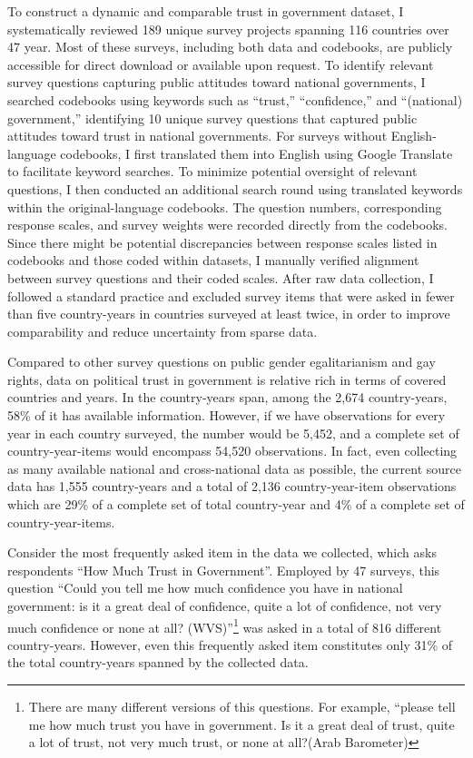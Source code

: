 \documentclass[
  12pt,
]{article}
\begin{document}
To construct a dynamic and comparable trust in government dataset, I systematically reviewed 189 unique survey projects spanning 116 countries over 47 year.
Most of these surveys, including both data and codebooks, are publicly accessible for direct download or available upon request.
To identify relevant survey questions capturing public attitudes toward national governments, I searched codebooks using keywords such as ``trust,'' ``confidence,'' and ``(national) government,'' identifying 10 unique survey questions that captured public attitudes toward trust in national governments.
For surveys without English-language codebooks, I first translated them into English using Google Translate to facilitate keyword searches.
To minimize potential oversight of relevant questions, I then conducted an additional search round using translated keywords within the original-language codebooks.
The question numbers, corresponding response scales, and survey weights were recorded directly from the codebooks.
Since there might be potential discrepancies between response scales listed in codebooks and those coded within datasets, I manually verified alignment between survey questions and their coded scales.
After raw data collection, I followed a standard practice and excluded survey items that were asked in fewer than five country-years in countries surveyed at least twice, in order to improve comparability and reduce uncertainty from sparse data.

Compared to other survey questions on public gender egalitarianism and gay rights, data on political trust in government is relative rich in terms of covered countries and years.
In the country-years span, among the 2,674 country-years, 58\% of it has available information.
However, if we have observations for every year in each country surveyed, the number would be 5,452, and a complete set of country-year-items would encompass 54,520 observations.
In fact, even collecting as many available national and cross-national data as possible, the current source data has 1,555 country-years and a total of 2,136 country-year-item observations which are 29\% of a complete set of total country-year and 4\% of a complete set of country-year-items.

Consider the most frequently asked item in the data we collected, which asks respondents ``How Much Trust in Government''.
Employed by 47 surveys, this question ``Could you tell me how much confidence you have in national government: is it a great deal of confidence, quite a lot of confidence, not very much confidence or none at all? (WVS)''\footnote{There are many different versions of this questions. For example, ``please tell me how much trust you have in government. Is it a great deal of trust, quite a lot of trust, not very much trust, or none at all?(Arab Barometer)} was asked in a total of 816 different country-years.
However, even this frequently asked item constitutes only 31\% of the total country-years spanned by the collected data.
\end{document}

